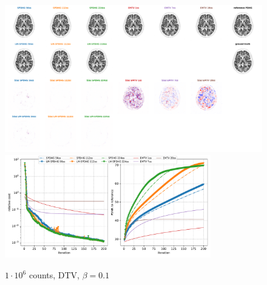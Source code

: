 \begin{figure}
  \centering
    \includegraphics[width=1.0\textwidth]{./figs/brain2d_counts_1.0E+06_seed_1_beta_1.0E-01_prior_DTV_niter_ref_20000_fwhm_4.5_4.5_niter_200.png}
    \includegraphics[width=0.8\textwidth]{./figs/brain2d_counts_1.0E+06_seed_1_beta_1.0E-01_prior_DTV_niter_ref_20000_fwhm_4.5_4.5_niter_200_metrics.pdf}
  \caption{$1\cdot10^6$ counts, DTV, $\beta = 0.1$}
\end{figure}
